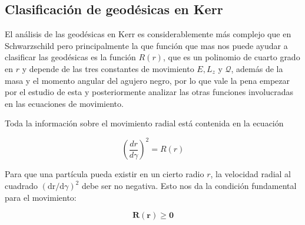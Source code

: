 \subsection{Clasificación de geodésicas en Kerr}
El análisis de las geodésicas en Kerr es considerablemente más complejo que en Schwarzschild pero principalmente la que función que mas nos puede ayudar a clasificar las geodésicas es la función $R(r)$, que es un polinomio de cuarto grado en $r$ y depende de las tres constantes de movimiento $E, L_z$ y $\mathcal{Q}$, además de la masa y el momento angular del agujero negro, por lo que vale la pena empezar por el estudio de esta y posteriormente analizar las otras funciones involucradas en las ecuaciones de movimiento.

Toda la información sobre el movimiento radial está contenida en la ecuación

\begin{equation}
    \left(\frac{d r}{d \gamma}\right)^2=R(r)
\end{equation}



Para que una partícula pueda existir en un cierto radio $r$, la velocidad radial al cuadrado $(\mathrm{dr} / \mathrm{d} \gamma)^2$ debe ser no negativa. Esto nos da la condición fundamental para el movimiento:

\begin{equation}
    \mathbf{R}(\mathbf{r}) \geq \mathbf{0}
\end{equation}

